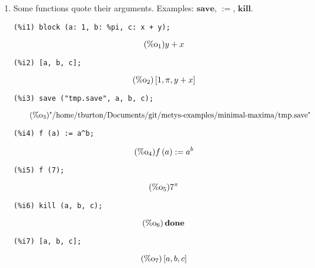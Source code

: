 \documentclass[12pt,leqno]{article}
\begin{document}
\begin{enumerate}
\item Some functions quote their arguments.
Examples: $\mathbf{save}$, $\mathbf{:=}$, $\mathbf{kill}$.
\begin{verbatim}
(%i1) block (a: 1, b: %pi, c: x + y);
\end{verbatim}
\begin{equation}
\tag{$\mathop{\mathrm{\%o}_{1}}$}y+x
\label{eq:doc-group1-code15-1-1}
\end{equation}
\begin{verbatim}
(%i2) [a, b, c];
\end{verbatim}
\begin{equation}
\tag{$\mathop{\mathrm{\%o}_{2}}$}\left[1, \pi, y+x\right]
\label{eq:doc-group1-code15-2-1}
\end{equation}
\begin{verbatim}
(%i3) save ("tmp.save", a, b, c);
\end{verbatim}
\begin{equation}
\tag{$\mathop{\mathrm{\%o}_{3}}$}\mbox{"/home/tburton/Documents/git/metys-examples/minimal-maxima/tmp.save"}
\label{eq:doc-group1-code15-3-1}
\end{equation}
\begin{verbatim}
(%i4) f (a) := a^b;
\end{verbatim}
\begin{equation}
\tag{$\mathop{\mathrm{\%o}_{4}}$}f\left(a\right) := {a}^{b}
\label{eq:doc-group1-code15-4-1}
\end{equation}
\begin{verbatim}
(%i5) f (7);
\end{verbatim}
\begin{equation}
\tag{$\mathop{\mathrm{\%o}_{5}}$}{7}^{\pi}
\label{eq:doc-group1-code15-5-1}
\end{equation}
\begin{verbatim}
(%i6) kill (a, b, c);
\end{verbatim}
\begin{equation}
\tag{$\mathop{\mathrm{\%o}_{6}}$}\mathop{\mathbf{done}}
\label{eq:doc-group1-code15-6-1}
\end{equation}
\begin{verbatim}
(%i7) [a, b, c];
\end{verbatim}
\begin{equation}
\tag{$\mathop{\mathrm{\%o}_{7}}$}\left[a, b, c\right]
\label{eq:doc-group1-code15-7-1}
\end{equation}



\end{enumerate}
\end{document}
